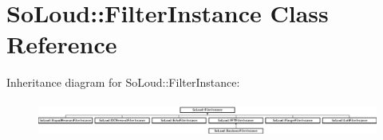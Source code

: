 \hypertarget{class_so_loud_1_1_filter_instance}{}\section{So\+Loud\+:\+:Filter\+Instance Class Reference}
\label{class_so_loud_1_1_filter_instance}
Inheritance diagram for So\+Loud\+:\+:Filter\+Instance\+:\begin{figure}[H]
\begin{center}
\leavevmode
\includegraphics[height=1.191489cm]{class_so_loud_1_1_filter_instance}
\end{center}
\end{figure}
